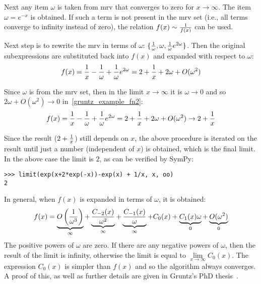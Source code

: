Next any item $\omega$ is taken from mrv that converges to zero for
$x\to\infty$. The item $\omega=e^{-x}$ is obtained. If such a term is not
present in the mrv set (i.e., all terms converge to infinity instead of zero),
the relation $f(x)\sim {1\over f(x)}$ can be used.

Next step is to rewrite the mrv in terms of $\omega$: $\{{1\over\omega},
\omega, {1\over\omega}e^{2\omega}\}$. Then the original subexpressions are
substituted back into $f(x)$ and expanded with respect to $\omega$:
\begin{equation}
    \label{gruntz_example_fn2}
f(x) = {1\over x}-{1\over\omega}+{1\over\omega}e^{2\omega}
     = 2+{1\over x} + 2\omega + O(\omega^2)
\end{equation}

Since $\omega$ is from the mrv set, then in the limit $x\to\infty$ it is
$\omega\to0$ and so $2\omega + O(\omega^2) \to 0$ in~\eqref{gruntz_example_fn2}:
\begin{equation}
f(x) = {1\over x}-{1\over\omega}+{1\over\omega}e^{2\omega}
    = 2+{1\over x} + 2\omega + O(\omega^2)
    \to 2 + {1\over x}
\end{equation}

Since the result ($2+{1\over x}$) still depends on $x$, the above procedure is
iterated on the result until just a number (independent of $x$) is obtained,
which is the final limit. In the above case the limit is $2$, as can be
verified by SymPy:

\begin{verbatim}
>>> limit(exp(x+2*exp(-x))-exp(x) + 1/x, x, oo)
2
\end{verbatim}

In general, when $f(x)$ is expanded in terms of $\omega$, it is obtained:
\begin{equation}
f(x) = \underbrace{O\left({1\over \omega^3}\right)}_\infty
    + \underbrace{C_{-2}(x)\over \omega^2}_\infty
    + \underbrace{C_{-1}(x)\over \omega}_\infty
    + {C_{0}(x)}
    + \underbrace{C_{1}(x)\omega}_0
    + \underbrace{O(\omega^2)}_0
\end{equation}
The positive powers of $\omega$ are zero. If there are any negative powers of
$\omega$, then the result of the limit is infinity, otherwise the limit is
equal to $\lim\limits_{x\to\infty} C_0(x)$. The expression $C_0(x)$ is simpler
than $f(x)$ and so the algorithm always converges. A proof of this, as well as
further details are given in Gruntz's PhD thesis~\cite{Gruntz1996limits}.
